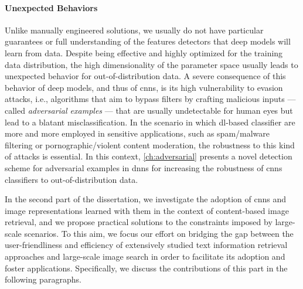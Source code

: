 \paragraph{Unexpected Behaviors}
Unlike manually engineered solutions, we usually do not have particular guarantees or full understanding of the features detectors that deep models will learn from data.
Despite being effective and highly optimized for the training data distribution, the high dimensionality of the parameter space usually leads to unexpected behavior for out-of-distribution data.
A severe consequence of this behavior of deep models, and thus of \glspl{cnn}, is its high vulnerability to evasion attacks, i.e., algorithms that aim to bypass filters by crafting malicious inputs --- called \emph{adversarial examples} --- that are usually undetectable for human eyes but lead to a blatant misclassification.
In the scenario in which \gls{dl}-based classifier are more and more employed in sensitive applications, such as spam/malware filtering or pornographic/violent content moderation, the robustness to this kind of attacks is essential.
In this context, \ref{ch:adversarial} presents a novel detection scheme for adversarial examples in \glspl{dnn} for increasing the robustness of \glspl{cnn} classifiers to out-of-distribution data.

In the second part of the dissertation, we investigate the adoption of \glspl{cnn} and image representations learned with them in the context of content-based image retrieval, and we propose practical solutions to the constraints imposed by large-scale scenarios.
To this aim, we focus our effort on bridging the gap between the user-friendliness and efficiency of extensively studied text information retrieval approaches and large-scale image search in order to facilitate its adoption and foster applications.
Specifically, we discuss the contributions of this part in the following paragraphs.

